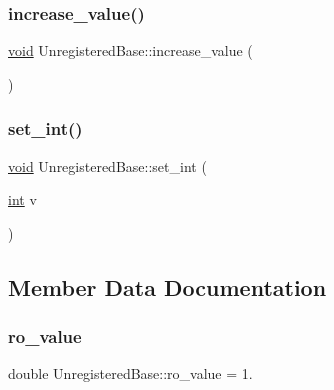 \mbox{\label{class_unregistered_base_a2c0aa0146aff9f458a3ac84269824b4d}} 
\subsubsection{\texorpdfstring{increase\_value()}{increase\_value()}}
{\footnotesize\ttfamily \mbox{\hyperlink{_s_d_l__opengles2__gl2ext_8h_ae5d8fa23ad07c48bb609509eae494c95}{void}} Unregistered\+Base\+::increase\+\_\+value (\begin{DoxyParamCaption}{ }\end{DoxyParamCaption})\hspace{0.3cm}{\ttfamily [inline]}}

\mbox{\label{class_unregistered_base_a1e5f6656715131b9aeae3010d8979f7a}} 
\subsubsection{\texorpdfstring{set\_int()}{set\_int()}}
{\footnotesize\ttfamily \mbox{\hyperlink{_s_d_l__opengles2__gl2ext_8h_ae5d8fa23ad07c48bb609509eae494c95}{void}} Unregistered\+Base\+::set\+\_\+int (\begin{DoxyParamCaption}\item[{\mbox{\hyperlink{warnings_8h_a74f207b5aa4ba51c3a2ad59b219a423b}{int}}}]{v }\end{DoxyParamCaption})\hspace{0.3cm}{\ttfamily [inline]}}



\subsection{Member Data Documentation}
\mbox{\label{class_unregistered_base_a6e5cc48161f673d009abb8a6d49c90ef}} 
\subsubsection{\texorpdfstring{ro\_value}{ro\_value}}
{\footnotesize\ttfamily double Unregistered\+Base\+::ro\+\_\+value = 1.}

